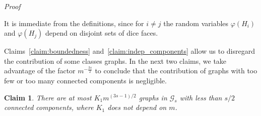 \documentclass[reqno,a4paper,11pt]{amsart}
\makeatletter
\newtheorem{claim}[lemma]{Claim}
\theoremstyle{remark}
\newcommand{\mc}[1]{{\mathcal #1}}
\numberwithin{equation}{section}
\renewenvironment{proof}[1][Proof]{\par
\pushQED{\qed}%
\normalfont \topsep6\p@\@plus6\p@\relax
\trivlist
\item\relax
{\itshape
#1\@addpunct{.}}\hspace\labelsep\ignorespaces
}{%
\popQED\endtrivlist\@endpefalse
}
\makeatother
\begin{document}
\begin{proof}
It is immediate from the definitions, since for $i \neq j$ the random variables
$\varphi(H_i)$ and $\varphi(H_j)$ depend on disjoint sets of dice faces.
\end{proof}

Claims~\ref{claim:boundedness} and~\ref{claim:indep_components} allow us to
disregard the contribution of some classes graphs. In the next
two claims, we take advantage of the factor $m^{-\frac{3s}{2}}$ to conclude that the contribution of
graphs with too few or too many connected components is negligible.

\begin{claim}
\label{claim:few_components}
There are at most $K_1m^{(3s-1)/2}$ graphs in $\mc G_s$ with less than $s/2$
connected components, where $K_1$ does not depend on $m$.
\end{claim}
\end{document}
